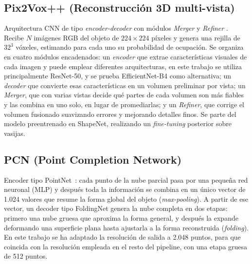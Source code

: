 \documentclass[10pt,a4paper]{report}
\begin{document}
\subsection{Pix2Vox++ (Reconstrucción 3D multi-vista)}
\label{subsec:pix2vox_modelo}
Arquitectura CNN de tipo \textit{encoder-decoder} con módulos \textit{Merger} y \textit{Refiner} \citep{xie2020pix2vox}. Recibe $N$ imágenes RGB del objeto de $224\times224$ píxeles y genera una rejilla de $32^3$ vóxeles, estimando para cada uno su probabilidad de ocupación. Se organiza en cuatro módulos encadenados: un \textit{encoder} que extrae características visuales de cada imagen y puede emplear diferentes arquitecturas, en este trabajo se utiliza principalmente ResNet-50, y se prueba EfficientNet-B4 como alternativa; un \textit{decoder} que convierte esas características en un volumen preliminar por vista; un \textit{Merger}, que con varias vistas decide qué partes de cada volumen son más fiables y las combina en uno solo, en lugar de promediarlas; y un \textit{Refiner}, que corrige el volumen fusionado suavizando errores y mejorando detalles finos. Se parte del modelo preentrenado en ShapeNet, realizando un \textit{fine-tuning} posterior sobre vasijas.

\subsection{PCN (Point Completion Network)}
\label{subsec:pcn_modelo}
Encoder tipo PointNet~\citep{qi2017pointnet}: cada punto de la nube parcial pasa por
una pequeña red neuronal (MLP) y después
toda la información se combina en un único vector de 1.024 valores que resume la forma
global del objeto (\textit{max-pooling}). A partir de ese vector, un decoder tipo
FoldingNet genera la nube completa en dos etapas: primero
una nube gruesa que aproxima la forma general, y después la expande deformando una
superficie plana hasta ajustarla a la forma
reconstruida (\textit{folding}). En este trabajo se ha adaptado la
resolución de salida a 2.048 puntos, para que
coincida con la resolución empleada en el resto del pipeline, con una etapa gruesa de
512 puntos.
\end{document}
